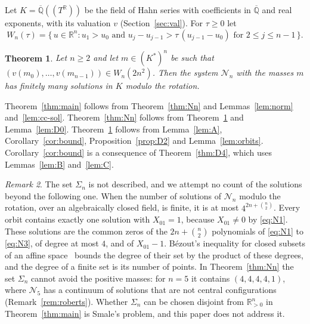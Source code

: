 \documentclass[11pt]{amsart}
\newtheorem{theorem}{Theorem}[section]
\theoremstyle{definition}
\theoremstyle{remark}
\newtheorem{remark}[theorem]{Remark}
\numberwithin{equation}{section}
\newcommand{\Qbar}{\overline{\mathbb{Q}}}
\newcommand{\RR}{\mathbb{R}}
\newcommand{\cN}{\mathcal{N}}
\begin{document}
Let $K = \Qbar((T^{\RR}))$ be the field of Hahn series with coefficients in $\Qbar$ and real exponents,
with its valuation $v$ (Section~\ref{sec:val}). For $\tau \ge 0$ let
\begin{equation}\label{eq:chamber}
  W_n(\tau) = \bigl\{\, u \in \RR^n : u_1 > u_0 \text{ and } u_j - u_{j-1} > \tau\,(u_{j-1} - u_0)
  \text{ for } 2 \le j \le n-1 \,\bigr\}.
\end{equation}

\begin{theorem}\label{thm:K}
Let $n \ge 2$ and let $m \in (K^{*})^n$ be such that $(v(m_0), \dots, v(m_{n-1})) \in W_n(2n^2)$. Then the
system $\cN_n$ with the masses $m$ has finitely many solutions in $K$ modulo the rotation.
\end{theorem}

Theorem~\ref{thm:main} follows from Theorem~\ref{thm:Nn} and Lemmas~\ref{lem:norm}
and~\ref{lem:cc-sol}. Theorem~\ref{thm:Nn} follows from Theorem~\ref{thm:K} and
Lemma~\ref{lem:D0}. Theorem~\ref{thm:K} follows from Lemma~\ref{lem:A}, Corollary~\ref{cor:bound},
Proposition~\ref{prop:D2} and Lemma~\ref{lem:orbits}. Corollary~\ref{cor:bound} is a consequence of
Theorem~\ref{thm:D4}, which uses Lemmas~\ref{lem:B} and~\ref{lem:C}.

\begin{remark}\label{rem:scope}
The set $\Sigma_n$ is not described, and we attempt no count of the solutions beyond the following one.
When the number of solutions of $\cN_n$ modulo the rotation, over an algebraically closed field, is
finite, it is at most $4^{2n + \binom{n}{2}}$. Every orbit contains exactly one solution with
$X_{01} = 1$, because $X_{01} \ne 0$ by \eqref{eq:N1}. These solutions are the common zeros of the
$2n + \binom{n}{2}$ polynomials of \eqref{eq:N1} to \eqref{eq:N3}, of degree at most $4$, and of
$X_{01} - 1$. B\'ezout's inequality for closed subsets of an affine
space~\cite[Theorem~1]{heintz1983} bounds the degree of their set by the product of these degrees, and
the degree of a finite set is its number of points. In
Theorem~\ref{thm:Nn} the set $\Sigma_n$ cannot avoid the positive masses: for $n = 5$ it contains
$(4, 4, 4, 4, 1)$, where $\cN_5$ has a continuum of solutions that are not central configurations
(Remark~\ref{rem:roberts}). Whether $\Sigma_n$ can be chosen disjoint from $\RR_{>0}^n$ in
Theorem~\ref{thm:main} is Smale's problem, and this paper does not address it.
\end{remark}
\end{document}
